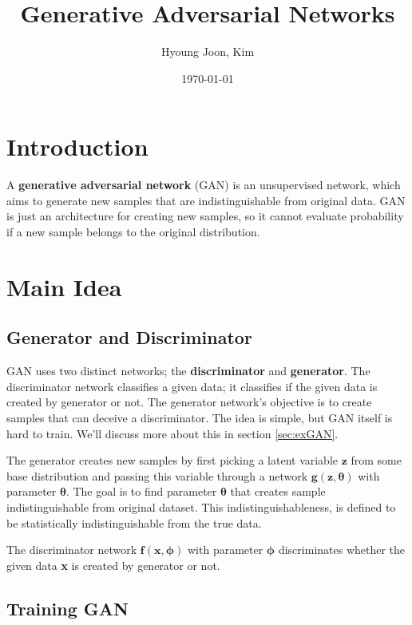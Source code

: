 \documentclass{article}
\title{Generative Adversarial Networks}
\author{Hyoung Joon, Kim}
\date{\today}
\begin{document}
\maketitle
\tableofcontents
\newpage

\section{Introduction}
A \textbf{generative adversarial network} (GAN) is an unsupervised network, which aims to
generate new samples that are indistinguishable from original data. GAN is just an architecture
for creating new samples, so it cannot evaluate probability if a new sample belongs to the original
distribution.


\section{Main Idea}
    \subsection{Generator and Discriminator}
        GAN uses two distinct networks; the \textbf{discriminator} and \textbf{generator}.
        The discriminator network classifies a given data; it classifies if the given data is created by generator or not.
        The generator network's objective is to create samples that can deceive a discriminator.
        The idea is simple, but GAN itself is hard to train. We'll discuss more about this in section \ref{sec:exGAN}.

        The generator creates new samples by first picking a latent variable $\textbf{z}$ from some base distribution
        and passing this variable through a network $\textbf{g}(\textbf{z}, \bm{\theta})$ with parameter $\bm{\theta}$.
        The goal is to find parameter $\bm{\theta}$ that creates sample indistinguishable from original dataset. This
        indistinguishableness, is defined to be statistically indistinguishable from the true data.

        The discriminator network $\textbf{f}(\textbf{x}, \bm{\phi})$ with parameter $\bm{\phi}$ discriminates
        whether the given data \textbf{x} is created by generator or not.

    \subsection{Training GAN}
\end{document}
